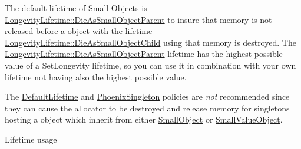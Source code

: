The default lifetime of Small-\/\+Objects is \hyperlink{structLoki_1_1LongevityLifetime_1_1DieAsSmallObjectParent}{Longevity\+Lifetime\+::\+Die\+As\+Small\+Object\+Parent} to insure that memory is not released before a object with the lifetime \hyperlink{structLoki_1_1LongevityLifetime_1_1DieAsSmallObjectChild}{Longevity\+Lifetime\+::\+Die\+As\+Small\+Object\+Child} using that memory is destroyed. The \hyperlink{structLoki_1_1LongevityLifetime_1_1DieAsSmallObjectParent}{Longevity\+Lifetime\+::\+Die\+As\+Small\+Object\+Parent} lifetime has the highest possible value of a Set\+Longevity lifetime, so you can use it in combination with your own lifetime not having also the highest possible value.

The \hyperlink{structLoki_1_1DefaultLifetime}{Default\+Lifetime} and \hyperlink{classLoki_1_1PhoenixSingleton}{Phoenix\+Singleton} policies are {\itshape not} recommended since they can cause the allocator to be destroyed and release memory for singletons hosting a object which inherit from either \hyperlink{classLoki_1_1SmallObject}{Small\+Object} or \hyperlink{classLoki_1_1SmallValueObject}{Small\+Value\+Object}.

\begin{DoxyParagraph}{Lifetime usage}

\end{DoxyParagraph}

